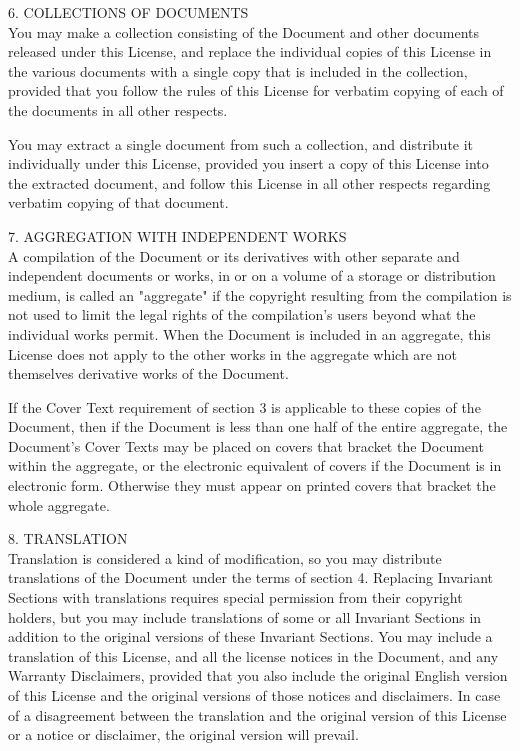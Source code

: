 \documentclass[oneside,12pt]{memoir} %
\begin{document}
6. COLLECTIONS OF DOCUMENTS\\

You may make a collection consisting of the Document and other documents released under this License, and replace the individual copies of this License in the various documents with a single copy that is included in the collection, provided that you follow the rules of this License for verbatim copying of each of the documents in all other respects.

You may extract a single document from such a collection, and distribute it individually under this License, provided you insert a copy of this License into the extracted document, and follow this License in all other respects regarding verbatim copying of that document.

7. AGGREGATION WITH INDEPENDENT WORKS\\

A compilation of the Document or its derivatives with other separate and independent documents or works, in or on a volume of a storage or distribution medium, is called an "aggregate" if the copyright resulting from the compilation is not used to limit the legal rights of the compilation's users beyond what the individual works permit. When the Document is included in an aggregate, this License does not apply to the other works in the aggregate which are not themselves derivative works of the Document.

If the Cover Text requirement of section 3 is applicable to these copies of the Document, then if the Document is less than one half of the entire aggregate, the Document's Cover Texts may be placed on covers that bracket the Document within the aggregate, or the electronic equivalent of covers if the Document is in electronic form. Otherwise they must appear on printed covers that bracket the whole aggregate.

8. TRANSLATION\\

Translation is considered a kind of modification, so you may distribute translations of the Document under the terms of section 4. Replacing Invariant Sections with translations requires special permission from their copyright holders, but you may include translations of some or all Invariant Sections in addition to the original versions of these Invariant Sections. You may include a translation of this License, and all the license notices in the Document, and any Warranty Disclaimers, provided that you also include the original English version of this License and the original versions of those notices and disclaimers. In case of a disagreement between the translation and the original version of this License or a notice or disclaimer, the original version will prevail.
\end{document}

